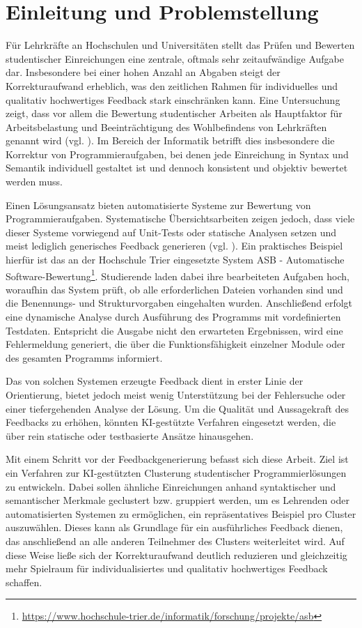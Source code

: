 \chapter{Einleitung und Problemstellung}

Für Lehrkräfte an Hochschulen und Universitäten stellt das Prüfen und Bewerten studentischer Einreichungen eine zentrale, oftmals sehr zeitaufwändige Aufgabe dar. Insbesondere bei einer hohen Anzahl an Abgaben steigt der Korrekturaufwand erheblich, was den zeitlichen Rahmen für individuelles und qualitativ hochwertiges Feedback stark einschränken kann. Eine Untersuchung zeigt, dass vor allem die Bewertung studentischer Arbeiten als Hauptfaktor für Arbeitsbelastung und Beeinträchtigung des Wohlbefindens von Lehrkräften genannt wird (vgl. \cite{Jerrim.2021}). Im Bereich der Informatik betrifft dies insbesondere die Korrektur von Programmieraufgaben, bei denen jede Einreichung in Syntax und Semantik individuell gestaltet ist und dennoch konsistent und objektiv bewertet werden muss.

Einen Lösungsansatz bieten automatisierte Systeme zur Bewertung von Programmieraufgaben. Systematische Übersichtsarbeiten zeigen jedoch, dass viele dieser Systeme vorwiegend auf Unit-Tests oder statische Analysen setzen und meist lediglich generisches Feedback generieren (vgl. \cite{Messer.2023}). Ein praktisches Beispiel hierfür ist das an der Hochschule Trier eingesetzte System ASB - Automatische Software-Bewertung\footnote{\url{https://www.hochschule-trier.de/informatik/forschung/projekte/asb}}. Studierende laden dabei ihre bearbeiteten Aufgaben hoch, woraufhin das System prüft, ob alle erforderlichen Dateien vorhanden sind und die Benennungs- und Strukturvorgaben eingehalten wurden. Anschließend erfolgt eine dynamische Analyse durch Ausführung des Programms mit vordefinierten Testdaten. Entspricht die Ausgabe nicht den erwarteten Ergebnissen, wird eine Fehlermeldung generiert, die über die Funktionsfähigkeit einzelner Module oder des gesamten Programms informiert.

Das von solchen Systemen erzeugte Feedback dient in erster Linie der Orientierung, bietet jedoch meist wenig Unterstützung bei der Fehlersuche oder einer tiefergehenden Analyse der Lösung. Um die Qualität und Aussagekraft des Feedbacks zu erhöhen, könnten KI-gestützte Verfahren eingesetzt werden, die über rein statische oder testbasierte Ansätze hinausgehen.

Mit einem Schritt vor der Feedbackgenerierung befasst sich diese Arbeit. Ziel ist ein Verfahren zur KI-gestützten Clusterung studentischer Programmierlösungen zu entwickeln. Dabei sollen ähnliche Einreichungen anhand syntaktischer und semantischer Merkmale geclustert bzw. gruppiert werden, um es Lehrenden oder automatisierten Systemen zu ermöglichen, ein repräsentatives Beispiel pro Cluster auszuwählen. Dieses kann als Grundlage für ein ausführliches Feedback dienen, das anschließend an alle anderen Teilnehmer des Clusters weiterleitet wird. Auf diese Weise ließe sich der Korrekturaufwand deutlich reduzieren und gleichzeitig mehr Spielraum für individualisiertes und qualitativ hochwertiges Feedback schaffen.

